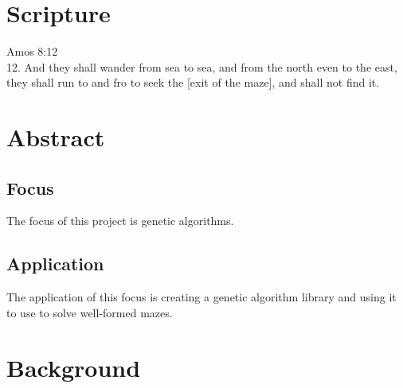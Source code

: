\documentclass[letterpaper, 12pt]{article}
\begin{document}
  \section{Scripture}
  Amos 8:12\\
  12. And they shall wander from sea to sea, and from the north even to the east,
  they shall run to and fro to seek the [exit of the maze], and shall not find it.

\section{Abstract}
  \subsection{Focus}
	 The focus of this project is genetic algorithms.
  \subsection{Application}
	 The application of this focus is creating a genetic algorithm library and using it to use to solve well-formed mazes.
\section{Background}
\end{document}
